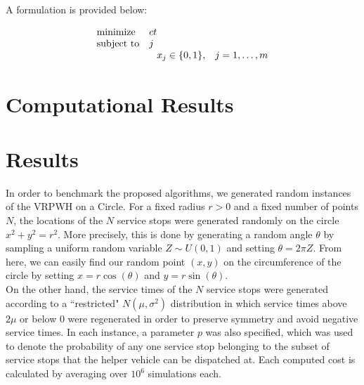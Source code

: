 \documentclass[12pt]{scrartcl}
\begin{document}
A formulation is provided below:

\begin{equation*}
\begin{array}{ll@{}ll}
\text{minimize}  & ct &\\
\text{subject to}&  j\\ &                                                & x_{j} \in \{0,1\}, &j=1 ,\dots, m
\end{array}
\end{equation*}
\fi


\section{Computational Results}

\section{Results}

In order to benchmark the proposed algorithms, we generated random instances of the VRPWH on a Circle. For a fixed radius $r > 0$ and a fixed number of points $N$, the locations of the $N$ service stops were generated randomly on the circle $x^2 + y^2 = r^2$. More precisely, this is done by generating a random angle $\theta$ by sampling a uniform random variable $Z \sim U(0, 1)$ and setting $\theta = 2\pi Z$. From here, we can easily find our random point $(x, y)$ on the circumference of the circle by setting $x = r\cos(\theta)$ and $y = r\sin(\theta)$. \\

On the other hand, the service times of the $N$ service stops were generated according to a ``restricted" $N(\mu, \sigma^2)$ distribution in which service times above $2\mu$ or below $0$ were regenerated in order to preserve symmetry and avoid negative service times. In each instance, a parameter $p$ was also specified, which was used to denote the probability of any one service stop belonging to the subset of service stops that the helper vehicle can be dispatched at. Each computed cost is calculated by averaging over $10^{6}$ simulations each. \\
\end{document}
